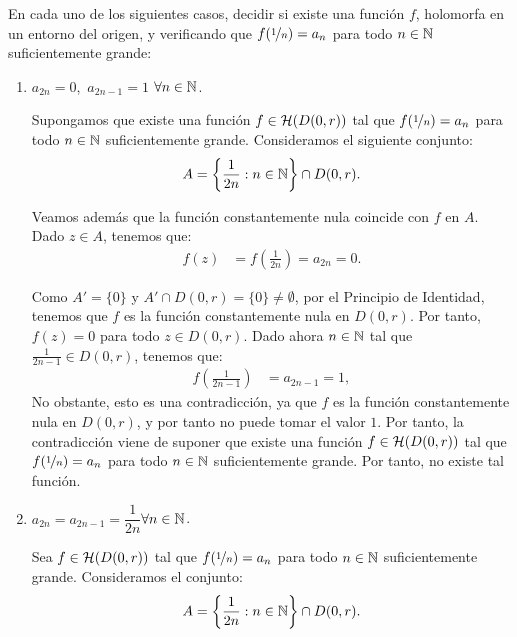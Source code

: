 \begin{ejercicio}
    En cada uno de los siguientes casos, decidir si existe una función $f$, holomorfa en un entorno del origen, y verificando que $f(\nicefrac{1}{n})=a_n$ para todo $n\in \mathbb{N}$ suficientemente grande:
    \begin{enumerate}
        \item $a_{2n}=0$,\ $a_{2n-1}=1$ \qquad$\forall n\in \mathbb{N}$.
        
        Supongamos que existe una función $f\in \mathcal{H}(D(0,r))$ tal que $f(\nicefrac{1}{n})=a_n$ para todo $n\in \mathbb{N}$ suficientemente grande. Consideramos el siguiente conjunto:
        \begin{equation*}
            A=\left\{ \frac{1}{2n} : n\in \mathbb{N} \right\} \cap D(0,r).
        \end{equation*}

        Veamos además que la función constantemente nula coincide con $f$ en $A$. Dado $z\in A$, tenemos que:
        \begin{align*}
            f(z) &= f\left(\frac{1}{2n}\right) = a_{2n} = 0.
        \end{align*}

        Como $A'=\{0\}$ y $A'\cap D(0,r)=\{0\}\neq \emptyset$, por el Principio de Identidad, tenemos que $f$ es la función constantemente nula en $D(0,r)$. Por tanto, $f(z)=0$ para todo $z\in D(0,r)$. Dado ahora $n\in \mathbb{N}$ tal que $\frac{1}{2n-1}\in D(0,r)$, tenemos que:
        \begin{align*}
            f\left(\frac{1}{2n-1}\right) &= a_{2n-1} = 1,
        \end{align*}
        No obstante, esto es una contradicción, ya que $f$ es la función constantemente nula en $D(0,r)$, y por tanto no puede tomar el valor $1$. Por tanto, la contradicción viene de suponer que existe una función $f\in \mathcal{H}(D(0,r))$ tal que $f(\nicefrac{1}{n})=a_n$ para todo $n\in \mathbb{N}$ suficientemente grande. Por tanto, no existe tal función.

        \item $a_{2n}=a_{2n-1}=\dfrac{1}{2n}$\qquad $\forall n\in \mathbb{N}$.
        
        Sea $f\in \mathcal{H}(D(0,r))$ tal que $f(\nicefrac{1}{n})=a_n$ para todo $n\in \mathbb{N}$ suficientemente grande. Consideramos el conjunto:
        \begin{equation*}
            A=\left\{ \frac{1}{2n} : n\in \mathbb{N} \right\} \cap D(0,r).
        \end{equation*}


\end{enumerate}
\end{ejercicio}
